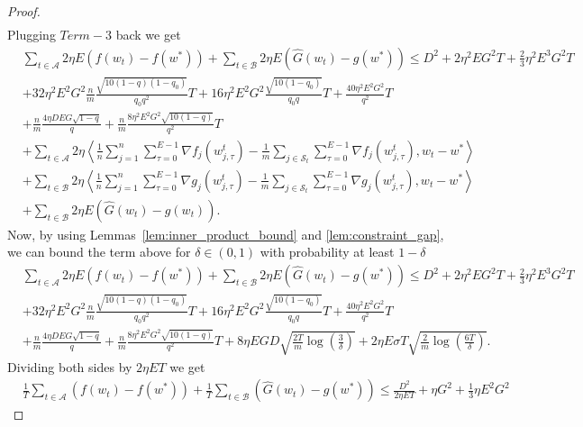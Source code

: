 \documentclass{article} %
\def\A{{\mathcal A}}
\def\B{{\mathcal B}}
\def\S{{\mathcal S}}
\begin{document}
\begin{proof}
\begin{align*}
    \end{align*}
    Plugging $Term-3$ back we get
     \begin{align*}
        &\sum_{t \in \A}2\eta E(f(w_t) - f(w^*) ) + \sum_{t \in \B}2\eta E(\hat{G}(w_t) - g(w^*)) \leq D^2+ 2\eta^2EG^2T + \frac{2}{3}\eta^2E^3G^2T 
        \\
        &+ 32\eta^2 E^2G^2\frac{n}{m}\frac{\sqrt{10(1-q) (1-q_0)}}{q_0q^2}T + 16\eta^2 E^2G^2\frac{\sqrt{10(1-q_0)}}{q_0q}T + \frac{40 \eta^2 E^2G^2}{ q^2}T
        \\
        & +  \frac{n}{m}\frac{4\eta DEG\sqrt{1-q}}{q} +  \frac{n}{m}\frac{8\eta^2 E^2G^2\sqrt{10(1-q)}}{ q^2}T 
        \\
        & + \sum_{t \in \A}2\eta \left\langle \frac{1}{n} \sum_{j=1}^{n} \sum_{\tau=0}^{E-1} \nabla f_j(w_{j,\tau}^t) 
        - \frac{1}{m} \sum_{j \in \S_t} \sum_{\tau=0}^{E-1} \nabla f_j(w_{j,\tau}^t), w_t - w^* \right\rangle  \\
        & + \sum_{t \in \B}2\eta \left\langle \frac{1}{n} \sum_{j=1}^{n} \sum_{\tau=0}^{E-1} \nabla g_j(w_{j,\tau}^t) 
        - \frac{1}{m} \sum_{j \in \S_t} \sum_{\tau=0}^{E-1} \nabla g_j(w_{j,\tau}^t), w_t - w^* \right\rangle
        \\
        & + \sum_{t \in \B}2\eta E(\hat{G}(w_t) - g(w_t)).
    \end{align*}
    Now, by using Lemmas~\ref{lem:inner_product_bound} and \ref{lem:constraint_gap}, we can bound the term above for $\delta \in (0,1)$ with probability at least $1-\delta$
    \begin{align*}
        &\sum_{t \in \A}2\eta E(f(w_t) - f(w^*) ) + \sum_{t \in \B}2\eta E(\hat{G}(w_t) - g(w^*)) \leq D^2+ 2\eta^2EG^2T + \frac{2}{3}\eta^2E^3G^2T 
        \\
        &+ 32\eta^2 E^2G^2\frac{n}{m}\frac{\sqrt{10(1-q) (1-q_0)}}{q_0q^2}T + 16\eta^2 E^2G^2\frac{\sqrt{10(1-q_0)}}{q_0q}T + \frac{40 \eta^2 E^2G^2}{ q^2}T
        \\
        & +  \frac{n}{m}\frac{4\eta DEG\sqrt{1-q}}{q} +  \frac{n}{m}\frac{8\eta^2 E^2G^2\sqrt{10(1-q)}}{ q^2}T 
         + 8\eta EGD\sqrt{\frac{2T}{m}\log\left(\frac{3}{\delta}\right)} +  2\eta E\sigma T \sqrt{\frac{2}{m} \log\left(\frac{6T}{\delta}\right)}.
    \end{align*}
    Dividing both sides by $2\eta E T$ we get
    \begin{align*}
        &\frac{1}{T}\sum_{t \in \A}(f(w_t) - f(w^*) ) + \frac{1}{T}\sum_{t \in \B} (\hat{G}(w_t) - g(w^*)) \leq \frac{D^2}{2\eta E T}+ \eta G^2 + \frac{1}{3}\eta E^2 G^2 

\end{align*}
\end{proof}
\end{document}
